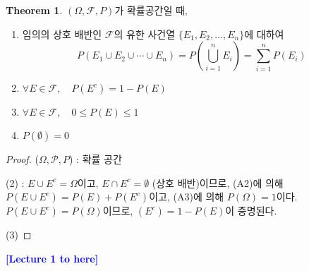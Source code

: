 \documentclass{article}
\theoremstyle{definition}
\newtheorem{theorem}{Theorem}
\begin{document}
\begin{theorem}
    $(\Omega, \mathcal{F}, P)$가 확률공간일 때,

\begin{enumerate}
  \item 임의의 상호 배반인 $\mathcal{F}$의 유한 사건열 $\{E_1, E_2, \dots, E_n\}$에 대하여
  \[
  P(E_1 \cup E_2 \cup \cdots \cup E_n) = P\left( \bigcup_{i=1}^n E_i \right) = \sum_{i=1}^n P(E_i)
  \]

  \item $\forall E \in \mathcal{F}, \quad P(E^c) = 1 - P(E)$

  \item $\forall E \in \mathcal{F}, \quad 0 \leq P(E) \leq 1$

  \item $P(\emptyset) = 0$
\end{enumerate}
\end{theorem}

\begin{proof}
    ($\Omega, \mathcal{P}, P$) : 확률 공간

    \noindent
    (2) : $E \cup E^c = \Omega$이고, $E \cap E^c = \emptyset$ (상호 배반)이므로, (A2)에 의해 $P(E\cup E^c) = P(E) + P(E^c)$이고, (A3)에 의해 $P(\Omega) = 1$이다. $P(E \cup E^c) = P(\Omega)$이므로, $(E^c) = 1-P(E)$이 증명된다.

    \noindent
    (3)
\end{proof}

\noindent
\textcolor{blue}{\textbf{[Lecture 1 to here]}}
\end{document}
